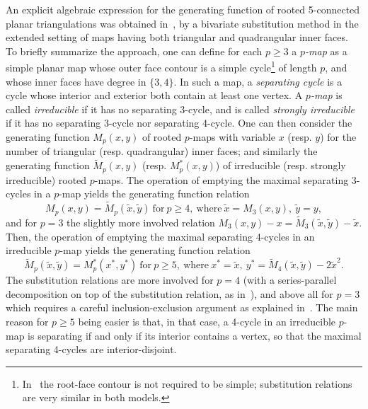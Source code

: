 \documentclass[letter]{amsart}
\numberwithin{theo}{section}
\theoremstyle{remark}
\def\tx{\tilde{x}}
\def\ty{\tilde{y}}
\def\sx{x^*}
\def\sy{y^*}
\def\tM{\widetilde{M}}
\def\sM{M^*}
\begin{document}
An explicit algebraic expression for the generating function of rooted 5-connected planar triangulations was obtained in~\cite{gao2001}, by a bivariate substitution method in the  extended setting of maps having both triangular and  quadrangular inner faces. 
To briefly summarize the approach, one can define for each $p\geq 3$ a \emph{$p$-map} as a simple planar map whose outer face contour is a simple cycle\footnote{In~\cite{gao2001} the root-face contour is not required to be simple; substitution relations are very similar in both models.} 
of length $p$, and whose inner faces have degree in $\{3,4\}$. In such a map, a \emph{separating cycle} is a cycle whose interior and exterior both contain at least one vertex. A \emph{$p$-map} is called \emph{irreducible} if it has no separating 3-cycle, and is called \emph{strongly irreducible} if it has no separating 3-cycle nor separating 4-cycle. 
One can then consider the generating function $M_p(x,y)$ of rooted $p$-maps with variable $x$ (resp. $y$) for the number of triangular (resp. quadrangular) inner faces; and similarly the generating function $\tM_p(x,y)$ (resp. $\sM_p(x,y)$) of irreducible (resp. strongly irreducible) rooted $p$-maps. The operation of emptying the maximal separating 3-cycles in a $p$-map yields the generating function relation
\begin{equation}\label{eq:irred}
M_p(x,y)=\tM_p(\tx,\ty)\ \mathrm{for}\ p\geq 4,\ \mathrm{where}\ \tx=M_3(x,y),\ \ty=y,
\end{equation}
and for $p=3$ the slightly more involved relation $M_3(x,y)-x=\tM_3(\tx,\ty)-\tx$. 
Then, the operation of emptying the maximal separating 4-cycles in an irreducible $p$-map yields the generating function relation
\begin{equation}\label{eq:strong_irred}
\tM_p(\tx,\ty)=\sM_p(\sx,\sy)\ \mathrm{for}\ p\geq 5,\ \mathrm{where}\ \sx=\tx,\ \sy=\tM_4(\tx,\ty)-2\tx^2.
\end{equation}
The substitution relations are more involved for $p=4$ (with a series-parallel decomposition on top of the substitution relation, as in~\cite{mullin1968enumeration}), and above all for $p=3$ which requires a careful inclusion-exclusion argument as explained in~\cite{gao2001}. The main reason for $p\geq 5$ being easier is that, in that case, a 4-cycle in an irreducible $p$-map is separating if and only if its interior contains a vertex, so that the maximal separating 4-cycles are interior-disjoint.  
\end{document}
